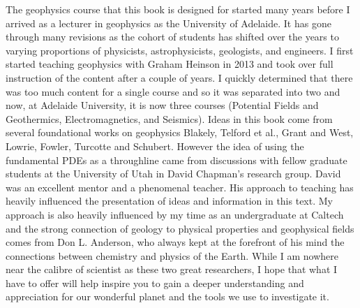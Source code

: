 The geophysics course that this book is designed for started many years before I arrived as a lecturer in geophysics as the University of Adelaide.  It has gone through many revisions as the cohort of students has shifted over the years to varying proportions of physicists, astrophysicists, geologists, and engineers. I first started teaching geophysics with Graham Heinson in 2013 and took over full instruction of the content after a couple of years.  I quickly determined that there was too much content for a single course and so it was separated into two and now, at Adelaide University, it is now three courses (Potential Fields and Geothermics, Electromagnetics, and Seismics).  Ideas in this book come from several foundational works on geophysics Blakely, Telford et al., Grant and West, Lowrie, Fowler, Turcotte and Schubert.  However the idea of using the fundamental PDEs as a throughline came from discussions with fellow graduate students at the University of Utah in David Chapman's research group.  David was an excellent mentor and a phenomenal teacher.  His approach to teaching has heavily influenced the presentation of ideas and information in this text.  My approach is also heavily influenced by my time as an undergraduate at Caltech and the strong connection of geology to physical properties and geophysical fields comes from Don L. Anderson, who always kept at the forefront of his mind the connections between chemistry and physics of the Earth.  While I am nowhere near the calibre of scientist as these two great researchers, I hope that what I have to offer will help inspire you to gain a deeper understanding and appreciation for our wonderful planet and the tools we use to investigate it.

